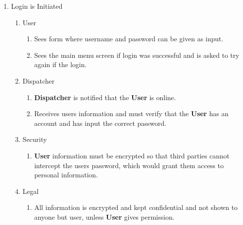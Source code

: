\documentclass[english]{article}
\begin{document}
\begin{enumerate}[{BE}1.]
	\item Login is Initiated
	\begin{enumerate}[{VP3}.1]
		\item User
			\begin{enumerate}
				\item Sees form where username and password can be given as input.
				\item Sees the main menu screen if login was successful and is asked to try again if the login.
			\end{enumerate}
		\item Dispatcher
			\begin{enumerate}
				\item \textbf{Dispatcher} is notified that the \textbf{User} is online.
				\item Receives users information and must verify that the \textbf{User} has an account and has input the correct password.
			\end{enumerate}
		\item Security
			\begin{enumerate}
				\item \textbf{User} information must be encrypted so that third parties cannot intercept the users password, which would grant them access to personal information.
			\end{enumerate}
		\item Legal
			\begin{enumerate}
				\item All information is encrypted and kept confidential and not shown to anyone but user, unless \textbf{User} gives permission.
			\end{enumerate}
	\end{enumerate}


\end{enumerate}
\end{document}
